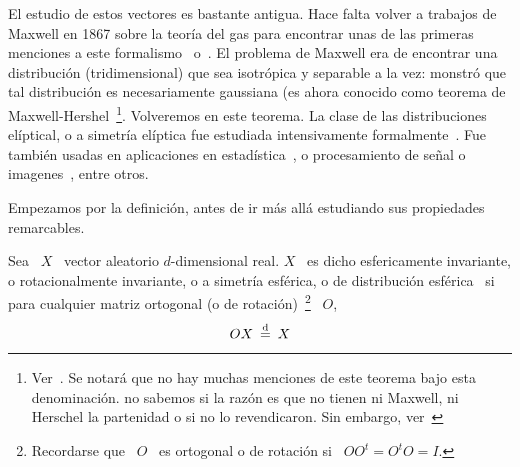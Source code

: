 \label{Ssec:MP:FamiliaEliptica}



\label{Ssec:MP:FamiliaElipticaReal}


El estudio de  estos vectores es bastante antigua. Hace  falta volver a trabajos
de Maxwell en 1867 sobre la teor\'ia del gas para encontrar unas de las primeras
menciones  a este  formalismo~\cite{Max67}  o~\cite[pp.~377--391]{Nie52:v1}.  El
problema de Maxwell era de encontrar una distribuci\'on (tridimensional) que sea
isotr\'opica  y  separable  a  la  vez:  monstr\'o  que  tal  distribuci\'on  es
necesariamente    gaussiana    (es    ahora    conocido    como    teorema    de
Maxwell-Hershel~\footnote{Ver~\cite[Prop.~4.11]{BilBre99}.   Se notar\'a  que no
  hay muchas menciones  de este teorema bajo esta  denominaci\'on. no sabemos si
  la raz\'on es que  no tienen ni Maxwell, ni Herschel la  partenidad o si no lo
  revendicaron. Sin embargo, ver~\cite{Max67}}.   Volveremos en este teorema. La
clase de las distribuciones el\'iptical, o a simetr\'ia el\'iptica fue estudiada
intensivamente  formalmente~\cite{Bar34,  Bar34:07,  Ver64, McgWag68,  CamHua81,
  Eat81,  Kan94,  Lau75,  Yao73,  KotNad01,  FanKot90,  Mui82,  BilBre99}.   Fue
tambi\'en  usadas   en  aplicaciones  en   estad\'istica~\cite{BlaTho68,  Chu73,
  YanKot03,  ArePin06,  BauPas07,  ChiPas08},   o  procesamiento  de  se\~nal  o
imagenes~\cite{Gol76, RanWei93, RanWei95, ZozVig10, Zoz12}, entre otros.

Empezamos  por  la  definici\'on,  antes  de  ir  m\'as  all\'a  estudiando  sus
propiedades remarcables.

\begin{definicion}
  Sea  \  $X$  \  vector   aleatorio  $d$-dimensional  real.   $X$  \  es  dicho
  esfericamente  invariante,  o   rotacionalmente  invariante,  o  a  simetr\'ia
  esf\'erica,  o  de  distribuci\'on  esf\'erica  \  si  para  cualquier  matriz
  ortogonal (o de rotaci\'on)~\footnote{Recordarse que \ $O$ \ es ortogonal o de
    rotaci\'on si \ $O O^t = O^t O = I$.} \ $O$,
  \[
  O  X  \: \stackrel{\mathrm{d}}{=}  \: X
  \]
\end{definicion}

